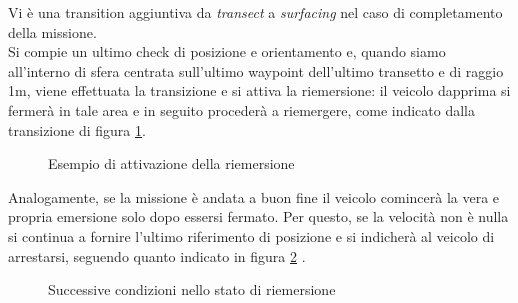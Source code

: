 \documentclass{article}
\begin{document}
            Vi è una transition aggiuntiva da \emph{transect} a \emph{surfacing} nel caso di completamento della missione.\\ 
            Si compie un ultimo check di posizione e orientamento e, quando siamo all'interno di sfera centrata sull'ultimo waypoint dell'ultimo transetto e di raggio 1m,
            viene effettuata la transizione e si attiva la riemersione: il veicolo dapprima si fermerà in tale area e in seguito procederà a riemergere, come indicato dalla transizione
            di figura \ref{fig:emer}.

            \begin{figure} [ht]
                \caption{Esempio di attivazione della riemersione}
                \label{fig:emer}
            \end{figure}
                
            Analogamente, se la missione è andata a buon fine il veicolo comincerà la vera e propria emersione solo dopo essersi fermato. Per questo, se la velocità 
            non è nulla si continua a fornire l'ultimo riferimento di posizione e si indicherà al veicolo di arrestarsi, seguendo quanto indicato in figura \ref{fig:emer2} .\\

            
            \begin{figure} [ht]
                \caption{Successive condizioni nello stato di riemersione}
                \label{fig:emer2}
            \end{figure}
\end{document}
